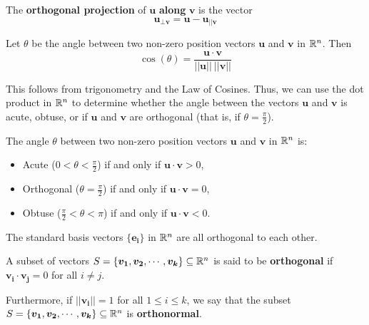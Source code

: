     \begin{definition}
    The \textbf{orthogonal projection} of $\bm{u}$ \textbf{along} $\bm{v}$ is the vector $$\bm{u_{\bot v}} = \bm{u} - \bm{u_{||v}}$$
    \end{definition}
    
    
\begin{proposition}\label{geometricdotproduct}
    Let $\theta$ be the angle between two non-zero position vectors $\bm{u}$ and $\bm{v}$ in $\mathbb{R}^n$.  Then  $$\cos(\theta) = \frac{\bm{u} \cdot \bm{v}}{||\bm{u}|| \ ||\bm{v}||}$$
    \end{proposition}

This follows from trigonometry and the Law of Cosines.  Thus, we can use the dot product in $\mathbb{R}^n$ to determine whether the angle between the vectors $\bm{u}$ and $\bm{v}$ is acute, obtuse, or if $\bm{u}$ and $\bm{v}$ are orthogonal (that is, if $\theta = \frac{\pi}{2}$).


\begin{proposition}
    The angle $\theta$ between two non-zero position vectors $\bm{u}$ and $\bm{v}$ in $\mathbb{R}^n$ is:
    \begin{itemize}
        \item Acute ($0 < \theta < \frac{\pi}{2}$) if and only if  $\bm{u} \cdot \bm{v} > 0$,
        \item Orthogonal ($\theta = \frac{\pi}{2}$) if and only if $\bm{u} \cdot \bm{v} = 0$,
        \item Obtuse ($\frac{\pi}{2} < \theta < \pi$) if and only if $\bm{u} \cdot \bm{v} < 0$.
    \end{itemize}
    
    \end{proposition}   

\begin{example}
    The standard basis vectors $\{\bm{e_i}\}$ in $\mathbb{R}^n$ are all orthogonal to each other.
\end{example}



\begin{definition}
    A subset of vectors $S = \{\bm{v_1}, \bm{v_2}, \cdots, \bm{v_k}\} \subseteq \mathbb{R}^n$ is said to be \textbf{orthogonal} if $ \bm{v_i} \cdot \bm{v_j}= 0$ for all $i \neq j$.
    
    \vspace{1em}
    
    Furthermore, if $||\bm{v_i}|| = 1$ for all $1 \leq i \leq k$, we say that the subset $S = \{\bm{v_1}, \bm{v_2}, \cdots, \bm{v_k}\} \subseteq \mathbb{R}^n$ is \textbf{orthonormal}.
\end{definition}


